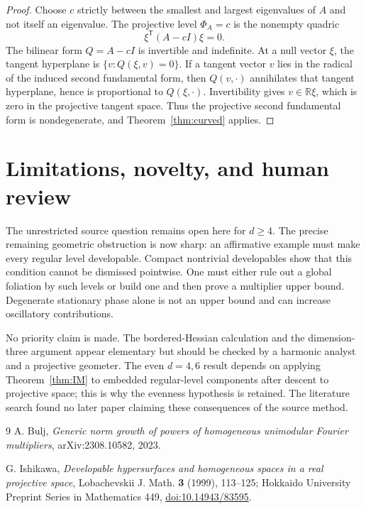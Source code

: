 \documentclass[11pt]{amsart}
\theoremstyle{remark}
\newcommand{\R}{\mathbb R}
\begin{document}
\begin{proof}
Choose $c$ strictly between the smallest and largest eigenvalues of $A$ and
not itself an eigenvalue.  The projective level $\Phi_A=c$ is the nonempty
quadric
\[
 \xi^{\mathsf T}(A-cI)\xi=0.
\]
The bilinear form $Q=A-cI$ is invertible and indefinite.  At a null vector
$\xi$, the tangent hyperplane is $\{v:Q(\xi,v)=0\}$.  If a tangent vector $v$
lies in the radical of the induced second fundamental form, then $Q(v,\cdot)$
annihilates that tangent hyperplane, hence is proportional to
$Q(\xi,\cdot)$.  Invertibility gives $v\in\R\xi$, which is zero in the
projective tangent space.  Thus the projective second fundamental form is
nondegenerate, and Theorem~\ref{thm:curved} applies.
\end{proof}

\section{Limitations, novelty, and human review}

The unrestricted source question remains open here for $d\ge4$.  The precise
remaining geometric obstruction is now sharp: an affirmative example must
make every regular level developable.  Compact nontrivial developables show
that this condition cannot be dismissed pointwise.  One must either rule out
a global foliation by such levels or build one and then prove a multiplier
upper bound.  Degenerate stationary phase alone is not an upper bound and can
increase oscillatory contributions.

No priority claim is made.  The bordered-Hessian calculation and the
dimension-three argument appear elementary but should be checked by a
harmonic analyst and a projective geometer.  The even $d=4,6$ result depends
on applying Theorem~\ref{thm:IM} to embedded regular-level components after
descent to projective space; this is why the evenness hypothesis is retained.
The literature search found no later paper claiming these consequences of
the source method.

\begin{thebibliography}{9}
A. Bulj,
\emph{Generic norm growth of powers of homogeneous unimodular Fourier
multipliers}, arXiv:2308.10582, 2023.

G. Ishikawa,
\emph{Developable hypersurfaces and homogeneous spaces in a real projective
space}, Lobachevskii J. Math. \textbf{3} (1999), 113--125;
Hokkaido University Preprint Series in Mathematics 449,
\href{https://doi.org/10.14943/83595}{doi:10.14943/83595}.
\end{thebibliography}
\end{document}
